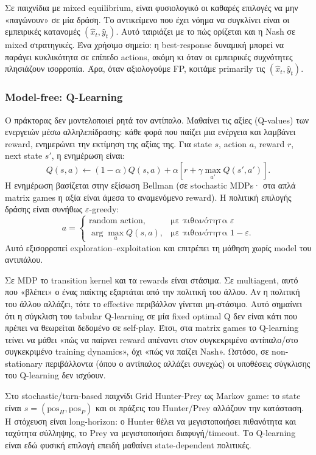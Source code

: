 \documentclass[11pt,a4paper]{article}
\begin{document}
Σε παιχνίδια με mixed equilibrium, είναι φυσιολογικό οι καθαρές επιλογές να μην «παγώνουν» σε μία δράση. Το αντικείμενο που έχει νόημα να συγκλίνει είναι οι εμπειρικές κατανομές \((\hat{x}_t, \hat{y}_t)\). Αυτό ταιριάζει με το πώς ορίζεται και η Nash σε mixed στρατηγικές. Ένα χρήσιμο σημείο: η best-response δυναμική μπορεί να παράγει κυκλικότητα σε επίπεδο actions, ακόμη κι όταν οι εμπειρικές συχνότητες πλησιάζουν ισορροπία. Άρα, όταν αξιολογούμε FP, κοιτάμε primarily τις \((\hat{x}_t, \hat{y}_t)\).

\subsubsection{Model-free: Q-Learning}

Ο πράκτορας δεν μοντελοποιεί ρητά τον αντίπαλο. Μαθαίνει τις αξίες (Q-values) των ενεργειών μέσω αλληλεπίδρασης: κάθε φορά που παίζει μια ενέργεια και λαμβάνει reward, ενημερώνει την εκτίμηση της αξίας της. Για state \(s\), action \(a\), reward \(r\), next state \(s'\), η ενημέρωση είναι:
\[
Q(s,a) \leftarrow (1-\alpha) Q(s,a) + \alpha \left[ r + \gamma \max_{a'} Q(s',a') \right].
\]
Η ενημέρωση βασίζεται στην εξίσωση Bellman (σε stochastic MDPs· στα απλά matrix games η αξία είναι άμεσα το αναμενόμενο reward). Η πολιτική επιλογής δράσης είναι συνήθως \(\varepsilon\)-greedy:
\[
a = \begin{cases} \text{random action}, & \text{με πιθανότητα } \varepsilon \\
\arg\max_a Q(s,a), & \text{με πιθανότητα } 1-\varepsilon. \end{cases}
\]
Αυτό εξισορροπεί exploration–exploitation και επιτρέπει τη μάθηση χωρίς model του αντιπάλου.

Σε MDP το transition kernel και τα rewards είναι στάσιμα. Σε multiagent, αυτό που «βλέπει» ο ένας παίκτης εξαρτάται από την πολιτική του άλλου. Αν η πολιτική του άλλου αλλάζει, τότε το effective περιβάλλον γίνεται μη-στάσιμο. Αυτό σημαίνει ότι η σύγκλιση του tabular Q-learning σε μία fixed optimal Q δεν είναι κάτι που πρέπει να θεωρείται δεδομένο σε self-play. Έτσι, στα matrix games το Q-learning τείνει να μάθει «πώς να παίρνει reward απέναντι στον συγκεκριμένο αντίπαλο/στο συγκεκριμένο training dynamics», όχι «πώς να παίζει Nash». Ωστόσο, σε non-stationary περιβάλλοντα (όπου ο αντίπαλος αλλάζει συνεχώς) οι υποθέσεις σύγκλισης του Q-learning δεν ισχύουν.

Στο stochastic/turn-based παιχνίδι Grid Hunter-Prey ως Markov game: το state είναι \(s = (\mathrm{pos}_H, \mathrm{pos}_P)\) και οι πράξεις του Hunter/Prey αλλάζουν την κατάσταση. Η στόχευση είναι long-horizon: ο Hunter θέλει να μεγιστοποιήσει πιθανότητα και ταχύτητα σύλληψης, το Prey να μεγιστοποιήσει διαφυγή/timeout. Το Q-learning είναι εδώ φυσική επιλογή επειδή μαθαίνει state-dependent πολιτικές.
\end{document}
